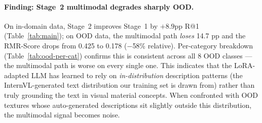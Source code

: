 \documentclass[10pt,twocolumn]{article}
\begin{document}
\paragraph{Finding: Stage~2 multimodal degrades sharply OOD.}
On in-domain data, Stage~2 improves Stage~1 by $+8.9$pp R@1 (Table~\ref{tab:main});
on OOD data, the multimodal path \emph{loses} 14.7 pp and the RMR-Score drops
from 0.425 to 0.178 ($-$58\% relative).
Per-category breakdown (Table~\ref{tab:ood-per-cat}) confirms this is
consistent across all 8 OOD classes --- the multimodal path is worse on every
single one.
This indicates that the LoRA-adapted LLM has learned to rely on
\emph{in-distribution} description patterns (the InternVL-generated text
distribution our training set is drawn from) rather than truly grounding the
text in visual material concepts.
When confronted with OOD textures whose auto-generated descriptions sit
slightly outside this distribution, the multimodal signal becomes noise.

\begin{table}[h]
\centering
\caption{Per-category OOD results (R@1 in \%, RMR-Score). Stage~2 multimodal
         is worse than Stage~1 visual on every category.}
\label{tab:ood-per-cat}
\end{table}
\end{document}
